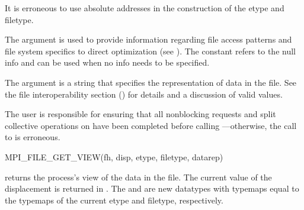 It is erroneous to use absolute addresses in the construction
of the etype and filetype.

The  argument is used to provide information
regarding file access patterns and file system specifics
to direct optimization
(see ).
The constant  refers to the null info
and can be used when no info needs to be specified.

The  argument is a string that specifies
the representation of data in the file.
See the file interoperability section
()
for details and a discussion of valid values.

The user is responsible for ensuring that all nonblocking requests
and split collective operations
on  have been completed before calling
---otherwise, the call to
 is erroneous.

%
%
\begin{funcdef}{MPI\_FILE\_GET\_VIEW}{(\mbox{fh}, \mbox{disp}, \mbox{etype}, \mbox{filetype}, \mbox{datarep})}
\end{funcdef}

 returns the process's view
of the data in the file.
The current value of the displacement is returned in .
The  and  are new datatypes
with typemaps equal to the typemaps
of the current etype and filetype, respectively.

